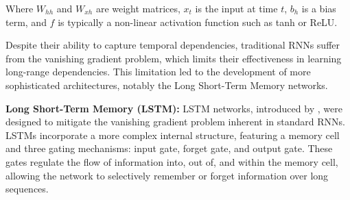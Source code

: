 Where $W_{hh}$ and $W_{xh}$ are weight matrices, $x_t$ is the input at time $t$, $b_h$ is a bias term, and $f$ is typically a non-linear activation function such as tanh or ReLU.

Despite their ability to capture temporal dependencies, traditional RNNs suffer from the vanishing gradient problem, which limits their effectiveness in learning long-range dependencies. This limitation led to the development of more sophisticated architectures, notably the Long Short-Term Memory networks.

\textbf{Long Short-Term Memory (LSTM):}
LSTM networks, introduced by \cite{hochreiter1997long}, were designed to mitigate the vanishing gradient problem inherent in standard RNNs. LSTMs incorporate a more complex internal structure, featuring a memory cell and three gating mechanisms: input gate, forget gate, and output gate. These gates regulate the flow of information into, out of, and within the memory cell, allowing the network to selectively remember or forget information over long sequences.

